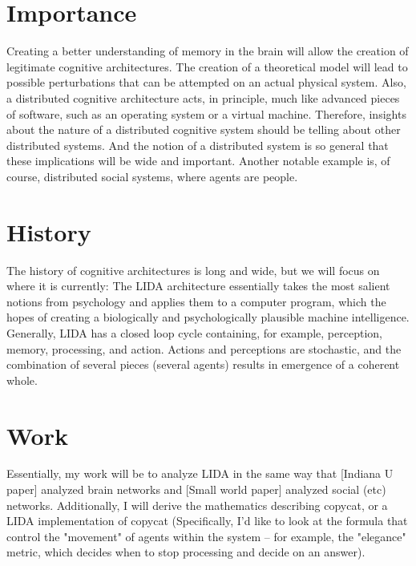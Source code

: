 \documentclass{nature}
\begin{document}
\section{Importance}

    Creating a better understanding of memory in the brain will allow the creation of legitimate cognitive architectures. 
    The creation of a theoretical model will lead to possible perturbations that can be attempted on an actual physical system.
    Also, a distributed cognitive architecture acts, in principle, much like advanced pieces of software, such as an operating system or a virtual machine.
    Therefore, insights about the nature of a distributed cognitive system should be telling about other distributed systems. 
    And the notion of a distributed system is so general that these implications will be wide and important.
    Another notable example is, of course, distributed social systems, where agents are people.

\section{History}


    The history of cognitive architectures is long and wide, but we will focus on where it is currently: 
    The LIDA architecture essentially takes the most salient notions from psychology and applies them to a computer program, which the hopes of creating a biologically and psychologically plausible machine intelligence.
    Generally, LIDA has a closed loop cycle containing, for example, perception, memory, processing, and action.
    Actions and perceptions are stochastic, and the combination of several pieces (several agents) results in emergence of a coherent whole.

\section{Work}

    Essentially, my work will be to analyze LIDA in the same way that [Indiana U paper] analyzed brain networks and [Small world paper] analyzed social (etc) networks. 
    Additionally, I will derive the mathematics describing copycat, or a LIDA implementation of copycat (Specifically, I'd like to look at the formula that control the "movement" of agents within the system -- for example, the "elegance" metric, which decides when to stop processing and decide on an answer). 
\end{document}
